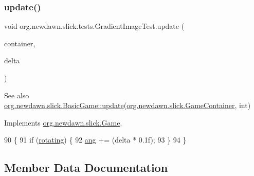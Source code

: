 \mbox{\label{classorg_1_1newdawn_1_1slick_1_1tests_1_1_gradient_image_test_a73a441115b261f313befad61c698da54}} 
\subsubsection{\texorpdfstring{update()}{update()}}
{\footnotesize\ttfamily void org.\+newdawn.\+slick.\+tests.\+Gradient\+Image\+Test.\+update (\begin{DoxyParamCaption}\item[{\mbox{\hyperlink{classorg_1_1newdawn_1_1slick_1_1_game_container}{Game\+Container}}}]{container,  }\item[{int}]{delta }\end{DoxyParamCaption})\hspace{0.3cm}{\ttfamily [inline]}}

\begin{DoxySeeAlso}{See also}
\mbox{\hyperlink{classorg_1_1newdawn_1_1slick_1_1_basic_game_acfe6fa05aef83bff1631af91a3e4bd20}{org.\+newdawn.\+slick.\+Basic\+Game\+::update}}(\mbox{\hyperlink{classorg_1_1newdawn_1_1slick_1_1_game_container}{org.\+newdawn.\+slick.\+Game\+Container}}, int) 
\end{DoxySeeAlso}


Implements \mbox{\hyperlink{interfaceorg_1_1newdawn_1_1slick_1_1_game_ab07b2e9463ee4631620dde0de25bdee8}{org.\+newdawn.\+slick.\+Game}}.


\begin{DoxyCode}
90                                                            \{
91         \textcolor{keywordflow}{if} (\mbox{\hyperlink{classorg_1_1newdawn_1_1slick_1_1tests_1_1_gradient_image_test_a94ae96939e1d695a4571141a25473139}{rotating}}) \{
92             \mbox{\hyperlink{classorg_1_1newdawn_1_1slick_1_1tests_1_1_gradient_image_test_adf131e114d3d83c2586f7605070087ce}{ang}} += (delta * 0.1f);
93         \}
94     \}
\end{DoxyCode}


\subsection{Member Data Documentation}
\mbox{\label{classorg_1_1newdawn_1_1slick_1_1tests_1_1_gradient_image_test_adf131e114d3d83c2586f7605070087ce}} 
